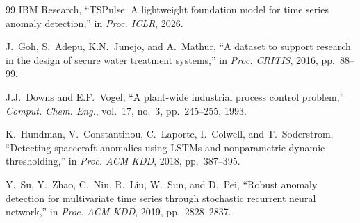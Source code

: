 \documentclass[preprint,12pt]{elsarticle}
\begin{document}
\begin{thebibliography}{99}
IBM Research, ``TSPulse: A lightweight foundation model for time series anomaly detection,'' in \emph{Proc. ICLR}, 2026.

J.~Goh, S.~Adepu, K.N.~Junejo, and A.~Mathur, ``A dataset to support research in the design of secure water treatment systems,'' in \emph{Proc. CRITIS}, 2016, pp.~88--99.

J.J.~Downs and E.F.~Vogel, ``A plant-wide industrial process control problem,'' \emph{Comput. Chem. Eng.}, vol.~17, no.~3, pp.~245--255, 1993.

K.~Hundman, V.~Constantinou, C.~Laporte, I.~Colwell, and T.~Soderstrom, ``Detecting spacecraft anomalies using LSTMs and nonparametric dynamic thresholding,'' in \emph{Proc. ACM KDD}, 2018, pp.~387--395.

Y.~Su, Y.~Zhao, C.~Niu, R.~Liu, W.~Sun, and D.~Pei, ``Robust anomaly detection for multivariate time series through stochastic recurrent neural network,'' in \emph{Proc. ACM KDD}, 2019, pp.~2828--2837.

\end{thebibliography}
\end{document}
